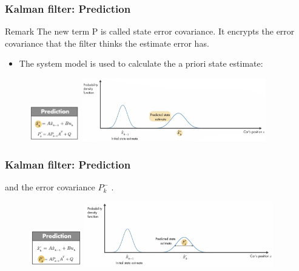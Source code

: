 \documentclass{beamer}
\begin{document}
\begin{frame}
	\frametitle{Kalman filter: Prediction}
	\begin{block}{Remark}
		The new term P is called state error covariance. It encrypts the error
		covariance that the filter thinks the estimate error has.
	\end{block}
	\begin{itemize}
		\item The system model is used to calculate the a priori state estimate:
	\end{itemize}
	\begin{figure}
		\centering
		\includegraphics[width=2.2cm]{priori_state_estimate.png}
		\includegraphics[width=8cm]{priori_state_estimate1.png}
	\end{figure}
\end{frame}

\begin{frame}
	\frametitle{Kalman filter: Prediction}
	and the error covariance $P^-_k $ .
	\begin{figure}
		\centering
		\includegraphics[width=2.3cm]{priori_error_cov.png}
		\includegraphics[width=8.2cm]{priori_error_cov1.png}
	\end{figure}
		
\end{frame}
\end{document}
